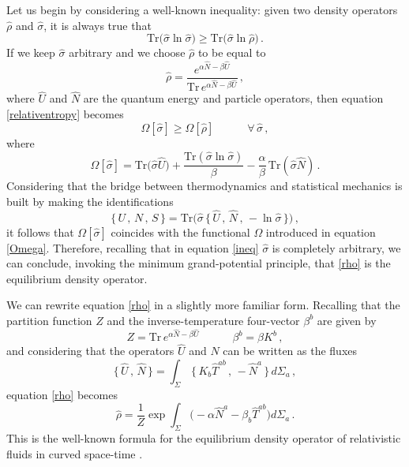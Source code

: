 \documentclass[a4paper, amsfonts, amssymb, amsmath, reprint, showkeys, nofootinbib, twoside, onecolumn,notitlepage]{revtex4-1}
\newcommand{\spc}{\quad \quad \quad}
\begin{document}
Let us begin by considering a well-known inequality: given two density operators $\hat{\rho}$ and $\hat{\sigma}$, it is always true that \cite{RelativeEntropy2000}
\begin{equation}\label{relativentropy}
\text{Tr}\big( \hat{\sigma} \ln \hat{\sigma} \big) \geq \text{Tr}\big(\hat{\sigma} \ln \hat{\rho} \big) \, . 
\end{equation}  
If we keep $\hat{\sigma}$ arbitrary and we choose $\hat{\rho}$ to be equal to
\begin{equation}\label{rho}
\hat{\rho} = \dfrac{e^{\alpha \hat{N}-\beta \hat{U}}}{\text{Tr} \, e^{\alpha \hat{N}-\beta \hat{U}}} \, ,
\end{equation}
where $\hat{U}$ and $\hat{N}$ are the quantum energy and particle operators, then equation \eqref{relativentropy} becomes
\begin{equation}\label{ineq}
\Omega[\hat{\sigma}] \geq \Omega[\hat{\rho}] \spc \forall \, \hat{\sigma} \, ,
\end{equation}
where 
\begin{equation}\label{ommuz}
\Omega[\hat{\sigma}] = \text{Tr}\big( \hat{\sigma} \hat{U} \big) + \dfrac{\text{Tr}(\hat{\sigma} \ln \hat{\sigma})}{\beta} -\dfrac{\alpha}{\beta} \, \text{Tr}(\hat{\sigma}\hat{N}) \, .
\end{equation}
Considering that the bridge between thermodynamics and statistical mechanics is built by making the identifications
\begin{equation}
\{ \, U \, , \, N \, , \, S \, \} = \text{Tr} \bigg( \hat{\sigma} \, \{ \, \hat{U} \, , \, \hat{N} \, , \, -\ln \hat{\sigma} \, \} \bigg) \, ,
\end{equation}
it follows that $\Omega[\hat{\sigma}]$  coincides with the functional $\Omega$ introduced in equation \eqref{Omega}. Therefore, recalling that in equation \eqref{ineq} $\hat{\sigma}$ is completely arbitrary, we can conclude, invoking the minimum grand-potential principle, that \eqref{rho} is the equilibrium density operator.

We can rewrite equation \eqref{rho} in a slightly more familiar form. Recalling that the partition function $Z$ and the inverse-temperature four-vector $\beta^b$ are given by
\begin{equation}
Z = \text{Tr} \, e^{\alpha \hat{N}-\beta \hat{U}} \spc \beta^b = \beta K^b \, ,
\end{equation} 
and considering that the operators $\hat{U}$ and $\hat{N}$ can be written as the fluxes
\begin{equation}
\{ \, \hat{U} \, , \, \hat{N} \, \} = \int_\Sigma \, \{ \, K_b \hat{T}^{ab} \, , \, -\hat{N}^a \,  \} \, d\Sigma_a \, ,
\end{equation}
equation \eqref{rho} becomes
\begin{equation}\label{gradncC}
\hat{\rho} = \dfrac{1}{Z} \exp \int_\Sigma \bigg(-\alpha \hat{N}^a - \beta_b \hat{T}^{ab}   \bigg) d\Sigma_a  \, .
\end{equation}
This is the well-known formula for the equilibrium density operator of relativistic fluids in curved space-time \cite{VANWEERT1982,BecattiniPRL2012,BecattiniQuantumCorrections2015,BecattiniBeta2016}. 
\end{document}
